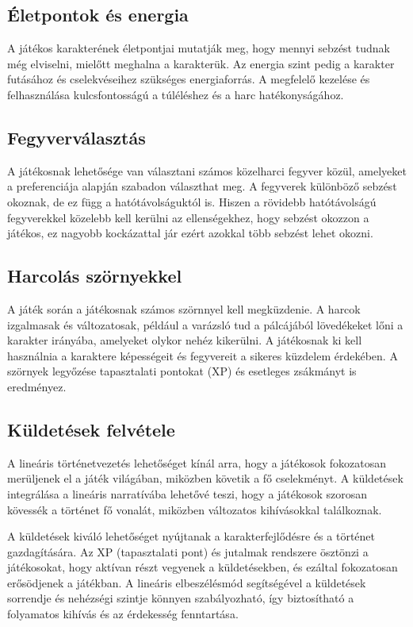 \subsection{Életpontok és energia}

\indent \indent A játékos karakterének életpontjai mutatják meg, hogy mennyi sebzést tudnak még elviselni, mielőtt meghalna a karakterük. Az energia szint pedig a karakter futásához és cselekvéseihez szükséges energiaforrás. A megfelelő kezelése és felhasználása kulcsfontosságú a túléléshez és a harc hatékonyságához.

\subsection{Fegyverválasztás}

\indent \indent A játékosnak lehetősége van választani számos közelharci fegyver közül, amelyeket a preferenciája alapján szabadon választhat meg. A fegyverek különböző sebzést okoznak, de ez függ a hatótávolságuktól is. Hiszen a rövidebb hatótávolságú fegyverekkel közelebb kell kerülni az ellenségekhez, hogy sebzést okozzon a játékos, ez nagyobb kockázattal jár ezért azokkal több sebzést lehet okozni.

\subsection{Harcolás szörnyekkel}

\indent \indent A játék során a játékosnak számos szörnnyel kell megküzdenie. A harcok izgalmasak és változatosak, például a varázsló tud a pálcájából lövedékeket lőni a karakter irányába, amelyeket olykor nehéz kikerülni. A játékosnak ki kell használnia a karaktere képességeit és fegyvereit a sikeres küzdelem érdekében. A szörnyek legyőzése tapasztalati pontokat (XP) és esetleges zsákmányt is eredményez.

\subsection{Küldetések felvétele}

\indent \indent A lineáris történetvezetés lehetőséget kínál arra, hogy a játékosok fokozatosan merüljenek el a játék világában, miközben követik a fő cselekményt. A küldetések integrálása a lineáris narratívába lehetővé teszi, hogy a játékosok szorosan kövessék a történet fő vonalát, miközben változatos kihívásokkal találkoznak.

A küldetések kiváló lehetőséget nyújtanak a karakterfejlődésre és a történet gazdagítására. Az XP (tapasztalati pont) és jutalmak rendszere ösztönzi a játékosokat, hogy aktívan részt vegyenek a küldetésekben, és ezáltal fokozatosan erősödjenek a játékban. A lineáris elbeszélésmód segítségével a küldetések sorrendje és nehézségi szintje könnyen szabályozható, így biztosítható a folyamatos kihívás és az érdekesség fenntartása.


